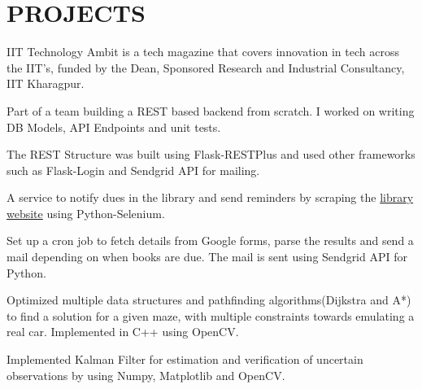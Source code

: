 \documentclass[]{deedy-resume-openfont}
\begin{document}
\begin{minipage}[t]{0.66\textwidth} 



\section{PROJECTS}

\vspace{\topsep} %
\begin{tightemize}
\item IIT Technology Ambit is a tech magazine that covers innovation in tech across the IIT's, funded by the Dean, Sponsored Research and Industrial Consultancy, IIT Kharagpur.  
\item Part of a team building a REST based backend from scratch. I worked on writing DB Models, API Endpoints and unit tests.
\item The REST Structure was built using Flask-RESTPlus and used other frameworks such as Flask-Login and Sendgrid API for mailing.
\end{tightemize}
\sectionsep

\begin{tightemize}
\item A service to notify dues in the library and send reminders by scraping the  {\href{http://www.library.iitkgp.ac.in/opac/myaccount/myAccount.html}{library website}} using Python-Selenium.
\item Set up a cron job to fetch details from Google forms, parse the results and send a mail depending on when books are due. The mail is sent using Sendgrid API for Python.
\end{tightemize}
\sectionsep

\begin{tightemize}
\item Optimized multiple data structures and pathfinding algorithms(Dijkstra and A*) to find a solution for a given maze, with multiple constraints towards emulating a real car. Implemented in C++ using OpenCV.
\item Implemented Kalman Filter for estimation and verification of uncertain observations by using Numpy, Matplotlib and OpenCV.


\end{tightemize}
\end{minipage}
\end{document}
